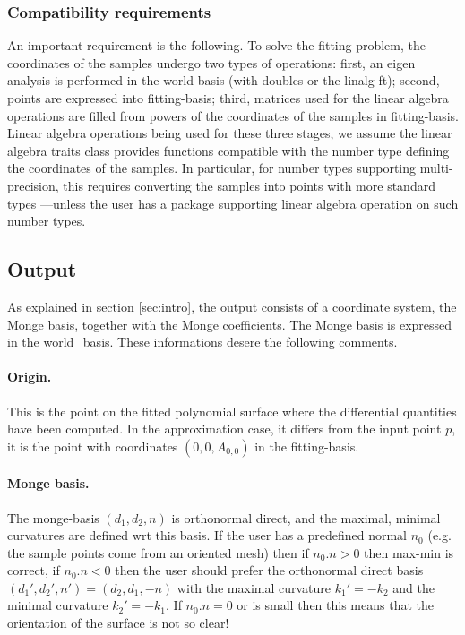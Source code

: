 \subsubsection{Compatibility requirements}

An important requirement is the following. To solve the fitting
problem, the coordinates of the samples undergo two types of
operations: first, an eigen analysis is performed in the world-basis
(with doubles or the linalg ft); second, points are expressed into
fitting-basis; third, matrices used for the linear algebra operations
are filled from powers of the coordinates of the samples in
fitting-basis. Linear algebra operations being used for these three
stages, we assume the linear algebra traits class provides functions
compatible with the number type defining the coordinates of the
samples. In particular, for number types supporting multi-precision,
this requires converting the samples into points with more standard
types ---unless the user has a package supporting linear algebra
operation on such number types.



\subsection{Output}

As explained in section \ref{sec:intro}, the output consists of a
coordinate system, the Monge basis, together with the Monge
coefficients. The Monge basis is expressed in the world\_basis. These
informations desere the following comments.

\paragraph{Origin.} This is the point on the fitted polynomial surface
where the differential quantities have been computed. In the
approximation case, it differs from the input point $p$, it is the
point with coordinates $(0,0,A_{0,0})$ in the fitting-basis.

\paragraph{Monge basis.} The monge-basis $(d_1,d_2,n)$ is orthonormal
direct, and the maximal, minimal curvatures are defined wrt this
basis. If the user has a predefined normal $n_0$ (e.g. the sample
points come from an oriented mesh) then if $n_0 . n >0$ then max-min is
correct, if $n_0 . n <0$ then the user should prefer the orthonormal
direct basis $(d_1',d_2',n')=(d_2,d_1,-n)$ with the maximal curvature
$k_1'=-k_2$ and the minimal curvature $k_2'=-k_1$. If $n_0 . n =0$ or
is small then this means that the orientation of the surface is not so
clear!

